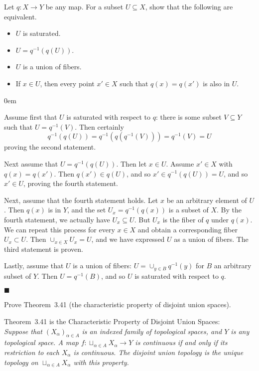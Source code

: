 \documentclass[12pt]{article}
\renewcommand{\qed}{\hfill$\blacksquare$}
\renewenvironment{proof}{\begin{addmargin}[1em]{0em}\begin{newproof}}{\end{newproof}\end{addmargin}\qed}
\newenvironment{problem}[2][Problem]{\begin{trivlist}
\item[\hskip \labelsep {\bfseries #1}\hskip \labelsep {\bfseries #2.}]}{\end{trivlist}}
\newenvironment{exercise}[2][Exercise]{\begin{trivlist}
\item[\hskip \labelsep {\bfseries #1}\hskip \labelsep {\bfseries #2.}]}{\end{trivlist}}
\begin{document}
\begin{exercise}{3.59}
Let $q:X\rightarrow Y$ be any map. For a subset $U\subseteq X$, show that the following are equivalent.
\begin{itemize}
	\item $U$ is saturated.
	\item $U=q^{-1}\left(q\left(U\right)\right)$.
	\item $U$ is a union of fibers.
	\item If $x\in U$, then every point $x' \in X$ such that $q\left(x\right) = q\left(x'\right)$ is also in $U$.
\end{itemize}
\end{exercise}
\begin{proof}
Assume first that $U$ is saturated with respect to $q$: there is some subset $V\subseteq Y$ such that $U=q^{-1}\left(V\right)$. Then certainly $$ q^{-1}\left(q\left(U\right)\right) = q^{-1}\left(q\left(q^{-1}\left(V\right)\right)\right) = q^{-1}\left(V\right) = U $$ proving the second statement.

Next assume that $U=q^{-1}\left(q\left(U\right)\right)$. Then let $x\in U$. Assume $x' \in X$ with $q\left(x\right) = q\left(x'\right)$. Then $q\left(x'\right) \in q\left(U\right)$, and so $x' \in q^{-1}\left(q\left(U\right)\right)=U$, and so $x'\in U$, proving the fourth statement.

Next, assume that the fourth statement holds. Let $x$ be an arbitrary element of $U$. Then $q\left(x\right)$ is in $Y$, and the set $U_x = q^{-1}\left(q\left(x\right)\right) $ is a subset of $X$. By the fourth statement, we actually have $U_x \subseteq U$. But $U_x$ is the fiber of $q$ under $q\left(x\right)$. We can repeat this process for every $x\in X$ and obtain a corresponding fiber $U_x \subset U$. Then $\cup_{x\in X} U_x = U$, and we have expressed $U$ as a union of fibers. The third statement is proven.

Lastly, assume that $U$ is a union of fibers: $U = \cup_{y \in B} q^{-1}\left(y\right)$ for $B$ an arbitrary subset of $Y$. Then $U = q^{-1}\left(B\right)$, and so $U$ is saturated with respect to $q$. 

\end{proof}









\begin{problem}{3-10}
Prove Theorem~3.41 (the characteristic property of disjoint union spaces).
\end{problem}
Theorem~3.41 is the Characteristic Property of Disjoint Union Spaces:\\
\textit{Suppose that $\left(X_{\alpha}\right)_{\alpha \in A}$ is an indexed family of topological spaces, and $Y$ is any topological space. A map $f:\sqcup_{\alpha \in A} X_{\alpha}\rightarrow Y$ is continuous if and only if its restriction to each $X_{\alpha}$ is continuous. The disjoint union topology is the unique topology on $\sqcup_{\alpha \in A} X_{\alpha}$ with this property.}\\
\end{document}
